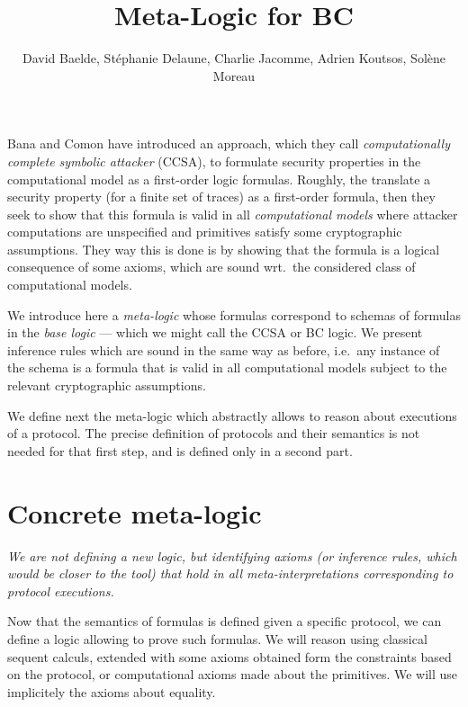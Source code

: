 \documentclass[a4paper]{article}
\theoremstyle{remark}
\begin{document}
\title{Meta-Logic for BC}

\author{David Baelde, Stéphanie Delaune,
  Charlie Jacomme, Adrien Koutsos, Solène Moreau}

\maketitle

\vfill

\tableofcontents

\vfill

\newpage

Bana and Comon have introduced an approach, which they call
\emph{computationally complete symbolic attacker} (CCSA),
to formulate security properties in the computational model as a first-order
logic formulas. Roughly, the translate a security property (for a finite set
of traces) as a first-order formula, then they seek to show that this formula
is valid in all \emph{computational models} where attacker computations
are unspecified and primitives satisfy some cryptographic assumptions. They
way this is done is by showing that the formula is a logical consequence of
some axioms, which are sound wrt.\ the considered class of computational 
models.

We introduce here a \emph{meta-logic} whose formulas correspond to schemas
of formulas in the \emph{base logic}
--- which we might call the CCSA or BC logic.
We present inference rules which are sound in the same way as before,
i.e.\ any instance of the schema is a formula that is valid in all
computational models subject to the relevant cryptographic assumptions.

We define next the meta-logic which abstractly allows to reason about
executions of a protocol. The precise definition of protocols and their
semantics is not needed for that first step, and is defined only in a
second part.





\section{Concrete meta-logic}

\emph{We are not defining a new logic, but identifying axioms (or inference
rules, which would be closer to the tool) that hold in all 
meta-interpretations corresponding to protocol executions.}

Now that the semantics of formulas is defined given a specific protocol, we 
can define a logic allowing to prove such formulas. We will reason using 
classical sequent calculs, extended with some axioms obtained form the 
constraints based on the protocol, or computational axioms made about the 
primitives. We will use implicitely the axioms about equality.
\end{document}
